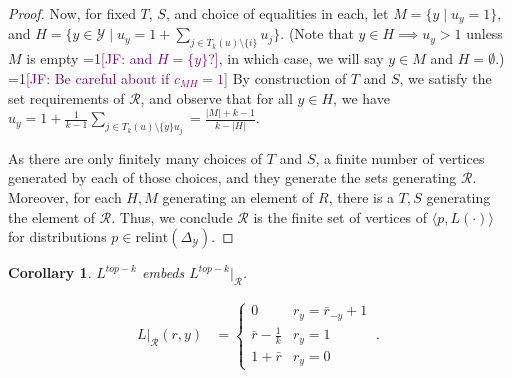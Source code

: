\documentclass[12pt]{article}
\newcommand{\Comments}{1}
\newcommand{\mynote}[2]{\ifnum\Comments=1\textcolor{#1}{#2}\fi}
\newcommand{\jessie}[1]{\mynote{purple}{[JF: #1]}}
\newcommand{\reals}{\mathbb{R}}
\newcommand{\simplex}{\Delta_\Y}
\newcommand{\R}{\mathcal{R}}
\newcommand{\U}{\mathcal{U}}
\newcommand{\Y}{\mathcal{Y}}
\newcommand{\inprod}[2]{\langle #1, #2 \rangle}%
\newtheorem{proposition}{Proposition}
\newtheorem{corollary}{Corollary}
\begin{document}
\begin{proof}
	Now, for fixed $T$, $S$, and choice of equalities in each, let $M = \{y \mid u_y = 1\}$, and $H = \{y \in \Y \mid u_y = 1 + \sum_{j \in T_k(u) \setminus \{i\}} u_j\}$.
	(Note that $y \in H \implies u_y > 1$ unless $M$ is empty \jessie{and $H = \{y\}$?}, in which case, we will say $y \in M$ and $H = \emptyset$.) 
	\jessie{Be careful about if $c_{MH} = 1$}
	By construction of $T$ and $S$, we satisfy the set requirements of $\R$, and observe that for all $y \in H$, we have $u_y = 1 + \frac 1 {k-1}\sum_{j \in T_k(u) \setminus \{y\} u_j} = \frac{|M| + k -1}{k - |H|}$.
	
	As there are only finitely many choices of $T$ and $S$, a finite number of vertices generated by each of those choices, and they generate the sets generating $\R$.
	Moreover, for each $H,M$ generating an element of $R$, there is a $T,S$ generating the element of $\R$.
	Thus, we conclude $\R$ is the finite set of vertices of $\inprod{p}{L(\cdot)}$ for distributions $p \in \mathrm{relint}(\simplex)$.
\end{proof}

\begin{corollary}
	$L^{top-k}$ embeds $L^{top-k}|_\R$.
\end{corollary}

\begin{align}
L|_{\R}(r,y) &= \begin{cases}
0 & r_y = \bar r_{-y} + 1\\
\bar r - \frac 1 k & r_y = 1\\
1 + \bar r & r_y = 0
\end{cases}~.~
\end{align}

\end{document}
